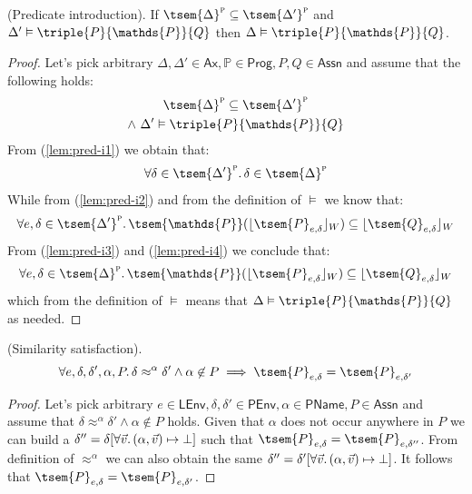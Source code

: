 \begin{lem}
	\label{lem:pred-i}
	(Predicate introduction).
	If $\tsem{\Delta}^\textsc{p} \subseteq \tsem{\Delta'}^\textsc{p}$ and $\Delta' \vDash \triple{P}{\mathds{P}}{Q}$ then $\Delta \vDash \triple{P}{\mathds{P}}{Q}$.
	\begin{proof}
		Let's pick arbitrary $\Delta, \Delta' \in \mathsf{Ax}, \mathds{P} \in \mathsf{Prog}, P, Q \in \mathsf{Assn}$ and assume that the following holds:
		\begin{gather}
			\label{lem:pred-i1} \tsem{\Delta}^\textsc{p} \subseteq \tsem{\Delta'}^\textsc{p} \\
			\label{lem:pred-i2} \land\ \Delta' \vDash \triple{P}{\mathds{P}}{Q}
		\end{gather}
		From (\ref{lem:pred-i1}) we obtain that:
		\begin{gather}
			\label{lem:pred-i3} \forall \delta \in \tsem{\Delta'}^\textsc{p} \ldotp \delta \in \tsem{\Delta}^\textsc{p}
		\end{gather}
		While from (\ref{lem:pred-i2}) and from the definition of $\vDash$ we know that:
		\begin{gather}
			\label{lem:pred-i4} \forall e, \delta \in \tsem{\Delta'}^\textsc{p} \ldotp \tsem{\mathds{P}}(\lfloor \tsem{P}_{e, \delta} \rfloor_W) \subseteq \lfloor \tsem{Q}_{e, \delta} \rfloor_W
		\end{gather}
		From (\ref{lem:pred-i3}) and (\ref{lem:pred-i4}) we conclude that:
		\[
			\forall e, \delta \in \tsem{\Delta}^\textsc{p} \ldotp \tsem{\mathds{P}}(\lfloor \tsem{P}_{e, \delta} \rfloor_W) \subseteq \lfloor \tsem{Q}_{e, \delta} \rfloor_W
		\]
		which from the definition of $\vDash$ means that $\Delta \vDash \triple{P}{\mathds{P}}{Q}$ as needed.
	\end{proof}
\end{lem}

\begin{lem}
	\label{lem:simSat}
	(Similarity satisfaction).
	\[
		\forall e, \delta, \delta', \alpha, P \ldotp \delta \approx^\alpha \delta' \land \alpha \not\in P \implies \tsem{P}_{e, \delta} = \tsem{P}_{e, \delta'}
	\]
	\begin{proof}
		Let's pick arbitrary $e \in \mathsf{LEnv}, \delta, \delta' \in \mathsf{PEnv}, \alpha \in \mathsf{PName}, P \in \mathsf{Assn}$ and assume that $\delta \approx^\alpha \delta' \land \alpha \not\in P$ holds. Given that $\alpha$ does not occur anywhere in $P$ we can build a $\delta'' = \delta[\forall \vec{v} \ldotp (\alpha, \vec{v}) \mapsto \bot]$ such that $\tsem{P}_{e, \delta} = \tsem{P}_{e, \delta''}$. From definition of $\approx^\alpha$ we can also obtain the same $\delta'' = \delta'[\forall \vec{v} \ldotp (\alpha, \vec{v}) \mapsto \bot]$. It follows that $\tsem{P}_{e, \delta} = \tsem{P}_{e, \delta'}$.
	\end{proof}
\end{lem}


